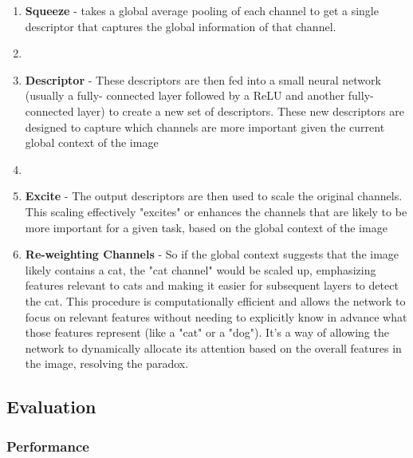 \documentclass[11pt]{article}
\begin{document}
\begin{enumerate}
    \item \textbf{Squeeze} -  takes a global average pooling of each channel to get a single
    descriptor that captures the global information of that channel.
    \item \item \textbf{Descriptor} - These descriptors are then fed into a small neural network (usually a fully-
    connected layer followed by a ReLU and another fully-connected layer) to create a new
    set of descriptors. These new descriptors are designed to capture which channels are
    more important given the current global context of the image
    \item \item \textbf{Excite} - The output descriptors are then used to scale the original channels. This scaling
    effectively "excites" or enhances the channels that are likely to be more important for a
    given task, based on the global context of the image
    \item \textbf{Re-weighting Channels} - So if the global context suggests that the image likely contains a cat, the "cat channel" would be scaled up, emphasizing features relevant to cats and making it easier for subsequent layers to detect the cat. This procedure is computationally efficient and allows the network to focus on relevant features without needing to explicitly know in advance what those features represent (like a "cat" or a "dog"). It's a way of allowing the network to dynamically allocate its attention based on the overall features in the image, resolving the paradox.
\end{enumerate}

\subsection{Evaluation}

\subsubsection{Performance}
\end{document}
